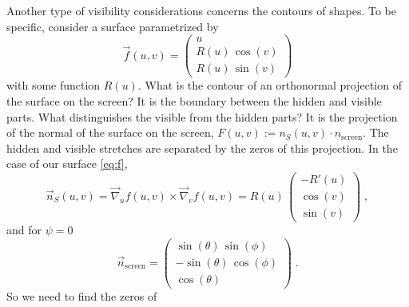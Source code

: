\documentclass[a4paper,fleqn]{ltxdoc}
\begin{document}
\begin{codeexample}[width=5.6cm]
\end{codeexample}


Another type of visibility considerations concerns the contours of shapes. To be
specific, consider a surface parametrized by
\begin{equation}\label{eq:f}
 \vec f(u,v)=\begin{pmatrix}
 u\\ R(u)\,\cos (v)\\ R(u)\,\sin (v)
 \end{pmatrix}
\end{equation}
with some function $R(u)$. What is the contour of an orthonormal projection of the
surface on the screen? It is the boundary between the hidden and visible parts.
What distinguishes the visible from the hidden parts? It is the projection of
the normal of the surface on the screen, $F(u,v):=n_S(u,v)\cdot 
n_\mathrm{screen}$. The hidden and visible stretches are separated by the zeros
of this projection. In the case of our surface \eqref{eq:f},
\begin{equation}
  \vec n_S(u,v)=\vec\nabla_u f(u,v)\times \vec\nabla_v f(u,v)
 =R(u)\,\begin{pmatrix}
 	-R'(u)\\ \cos (v)\\ \sin (v)
 \end{pmatrix}\;,
\end{equation}
and for $\psi=0$
\begin{equation}
 \vec n_\mathrm{screen}=\begin{pmatrix}
 	\sin(\theta)\,\sin (\phi)\\
	-\sin (\theta )\,\cos(\phi)\\
	\cos (\theta)
  \end{pmatrix}\;.
\end{equation}
So we need to find the zeros of 
\end{document}
